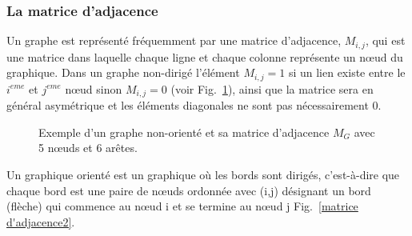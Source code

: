   \subsubsection{La matrice d’adjacence}
 Un graphe est représenté fréquemment par une matrice d'adjacence, $M_{i,j}$, qui est une matrice dans laquelle chaque ligne et
 chaque colonne représente un nœud du graphique. Dans un graphe non-dirigé l'élément $M_{i,j}=1$ si un lien existe entre le $i^{eme}$ et $j^{eme}$
 nœud sinon $M_{i,j}=0$  (voir Fig.~\ref{matrice d'adjacence}), ainsi que la matrice sera en général asymétrique et les éléments diagonales ne sont pas
 nécessairement $0$.
  \begin{figure}[h]
 	\centering
 	\caption{Exemple d'un graphe non-orienté et sa matrice d'adjacence $M_G$ avec 5 nœuds et 6 arêtes.}
 	\label{matrice d'adjacence}
 \end{figure}  
 
  Un graphique orienté est un graphique où les bords sont dirigés, c'est-à-dire que chaque bord est une paire de nœuds ordonnée avec ($\mathrm{i}$,$\mathrm{j}$) désignant un bord (flèche) qui commence au nœud $\mathrm{i}$ et se termine au nœud $\mathrm{j}$ Fig.~\ref{matrice d'adjacence2}. 
 
